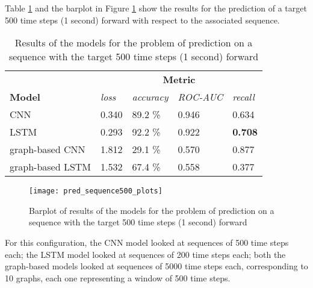 Table \ref{tab:pred_sequence500_results} and the barplot in Figure \ref{fig:pred_sequence500_plots} show the results for the prediction of a target 500 time steps (1 second) forward with respect to the associated sequence.
\begin{table}[htbp]
    \centering
    \begin{tabular}{lllll}
        \hline
                          & \multicolumn{4}{c}{\textbf{Metric}}                                    \\ \cline{2-5} 
        \textbf{Model}    & \textit{loss} & \textit{accuracy} & \textit{ROC-AUC} & \textit{recall} \\ \hline
        CNN               & 0.340         & 89.2 \%           & 0.946            & 0.634           \\
        LSTM              & 0.293         & 92.2 \%           & 0.922            & \textbf{0.708}  \\
        graph-based CNN   & 1.812         & 29.1 \%           & 0.570            & 0.877           \\
        graph-based LSTM  & 1.532         & 67.4 \%           & 0.558            & 0.377           \\\hline
    \end{tabular}
    \caption{Results of the models for the problem of prediction on a sequence with the target 500 time steps (1 second) forward}
    \label{tab:pred_sequence500_results}
\end{table}

\begin{figure}[htbp]
    \centering
    \texttt{[image: pred\_sequence500\_plots]}
    \caption{Barplot of results of the models for the problem of prediction on a sequence with the target 500 time steps (1 second) forward}
    \label{fig:pred_sequence500_plots}
\end{figure}

For this configuration, the CNN model looked at sequences of 500 time steps each; the LSTM model looked at sequences of 200 time steps each; both the graph-based models looked at sequences of 5000 time steps each, corresponding to 10 graphs, each one representing a window of 500 time steps.

